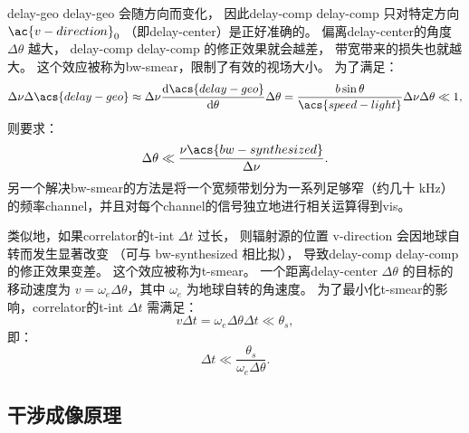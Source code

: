 \acl{delay-geo} \acs{delay-geo} 会随方向而变化，
因此\acl{delay-comp} \acs{delay-comp} 只对特定方向 $\ac{v-direction}_0$
（即\ac{delay-center}）是正好准确的。
偏离\ac{delay-center}的角度 $\Delta\theta$ 越大，
\acl{delay-comp} \acs{delay-comp} 的修正效果就会越差，
带宽带来的损失也就越大。
这个效应被称为\acf{bw-smear}，限制了有效的视场大小。
为了满足：
\begin{equation}
  \Delta\nu \Delta\acs{delay-geo}
    \approx \Delta\nu \diff{\acs{delay-geo}}{\theta} \Delta\theta
    = \frac{b \sin\theta}{\acs{speed-light}} \Delta\nu \Delta\theta
    \ll 1 ,
\end{equation}
则要求：
\begin{equation}
  \Delta\theta \ll \frac{\nu \acs{bw-synthesized}}{\Delta\nu} .
\end{equation}
另一个解决\ac{bw-smear}的方法是将一个宽频带划分为一系列足够窄（约几十 \si{\kHz}）
的频率\ac{channel}，并且对每个\ac{channel}的信号独立地进行相关运算得到\ac{vis}。

类似地，如果\ac{correlator}的\ac{t-int} $\Delta t$ 过长，
则辐射源的位置 \ac{v-direction} 会因地球自转而发生显著改变
（可与 \acs{bw-synthesized} 相比拟），
导致\acl{delay-comp} \acs{delay-comp} 的修正效果变差。
这个效应被称为\acf{t-smear}。
一个距离\ac{delay-center} $\Delta\theta$ 的目标的移动速度为
$v = \omega_e \Delta\theta$，其中 $\omega_e$ 为地球自转的角速度。
为了最小化\ac{t-smear}的影响，\ac{correlator}的\ac{t-int} $\Delta t$ 需满足：
\begin{equation}
  v \Delta t = \omega_e \Delta\theta \Delta t \ll \theta_s ,
\end{equation}
即：
\begin{equation}
  \label{eq:correlator-avgtime}
  \Delta t \ll \frac{\theta_s}{\omega_e \Delta\theta} .
\end{equation}

\subsection{干涉成像原理}

